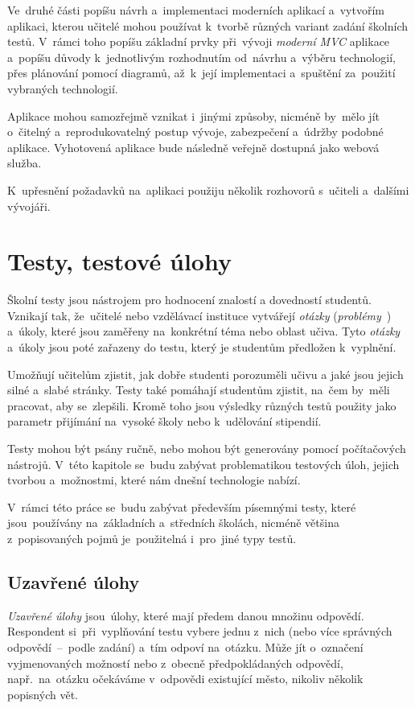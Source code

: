 \documentclass[11pt,a4paper]{report}
\begin{document}
        Ve~druhé části popíšu návrh a~implementaci moderních aplikací a~vytvořím aplikaci, kterou učitelé mohou používat k~tvorbě různých variant zadání školních testů. V~rámci toho popíšu základní prvky při~vývoji \emph{moderní \emph{MVC}} aplikace a~popíšu důvody k~jednotlivým rozhodnutím od~návrhu a~výběru technologií, přes plánování pomocí diagramů, až~k~její implementaci a~spuštění za~použití vybraných technologií.
        
        Aplikace mohou samozřejmě vznikat i~jinými způsoby, nicméně by~mělo jít o~čitelný a~reprodukovatelný postup vývoje, zabezpečení a~údržby podobné aplikace. Vyhotovená aplikace bude následně veřejně dostupná jako webová služba.

        K~upřesnění požadavků na~aplikaci použiju několik rozhovorů s~učiteli a~dalšími vývojáři.

    \chapter{Testy, testové úlohy}
        Školní testy jsou nástrojem pro hodnocení znalostí a dovedností studentů. Vznikají tak, že~učitelé nebo vzdělávací instituce vytvářejí \emph{otázky} (\emph{problémy}~\cite{zhouf:tvorbamatproblemu}) a~úkoly, které jsou zaměřeny na~konkrétní téma nebo oblast učiva. Tyto \emph{otázky} a~úkoly jsou poté zařazeny do testu, který je studentům předložen k~vyplnění.

        Umožňují učitelům zjistit, jak dobře studenti porozuměli učivu a jaké jsou jejich silné a~slabé stránky. Testy také pomáhají studentům zjistit, na~čem by~měli pracovat, aby se~zlepšili. Kromě toho jsou výsledky různých testů použity jako parametr přijímání na~vysoké školy nebo k~udělování stipendií.
        
        Testy mohou být psány ručně, nebo mohou být generovány pomocí počítačových nástrojů. V~této kapitole se~budu zabývat problematikou testových úloh, jejich tvorbou a~možnostmi, které nám dnešní technologie nabízí.

        V~rámci této práce se~budu zabývat především písemnými testy, které jsou~používány na~základních a~středních školách, nicméně většina z~popisovaných pojmů je~použitelná i~pro~jiné typy testů.

        \section{Uzavřené úlohy}
            \emph{Uzavřené úlohy} jsou~úlohy, které mají předem danou množinu odpovědí. Respondent si~při~vyplňování testu vybere jednu z~nich (nebo více správných odpovědí~--~podle zadání) a~tím odpoví na~otázku. Může jít o~označení vyjmenovaných možností nebo z~obecně předpokládaných odpovědí, např.~na~otázku  očekáváme v~odpovědi existující město, nikoliv několik popisných vět.
\end{document}
